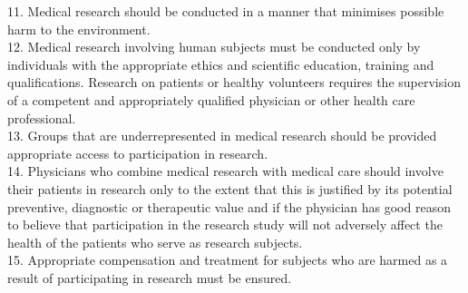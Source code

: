 11. Medical research should be conducted in a manner that minimises possible harm to the environment.\\
12. Medical research involving human subjects must be conducted only by individuals with the appropriate ethics and scientific education, training and qualifications. Research on patients or healthy volunteers requires the supervision of a competent and appropriately qualified physician or other health care professional.\\
13. Groups that are underrepresented in medical research should be provided appropriate access to participation in research.\\
14. Physicians who combine medical research with medical care should involve their patients in research only to the extent that this is justified by its potential preventive, diagnostic or therapeutic value and if the physician has good reason to believe that participation in the research study will not adversely affect the health of the patients who serve as research subjects.\\
15. Appropriate compensation and treatment for subjects who are harmed as a result of participating in research must be ensured.

\cleardoublepage
{}